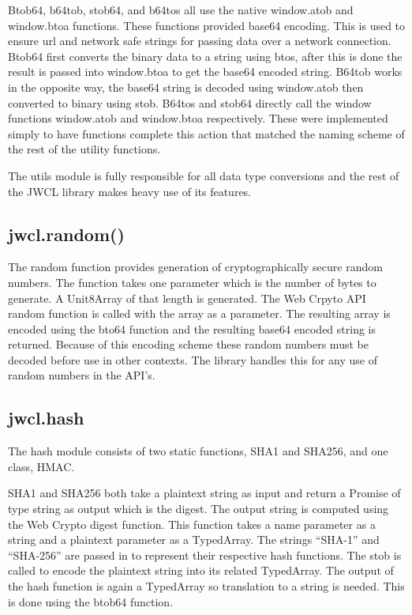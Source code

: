 Btob64, b64tob, stob64, and b64tos all use the native window.atob and window.btoa functions. \cite{mdn-base} These functions provided base64 encoding. This is used to ensure url and network safe strings for passing data over a network connection. Btob64 first converts the binary data to a string using btos, after this is done the result is passed into window.btoa to get the base64 encoded string. B64tob works in the opposite way, the base64 string is decoded using window.atob then converted to binary using stob. B64tos and stob64 directly call the window functions window.atob and window.btoa respectively. These were implemented simply to have functions complete this action that matched the naming scheme of the rest of the utility functions.


The utils module is fully responsible for all data type conversions and the rest of the JWCL library makes heavy use of its features.


\subsection{jwcl.random()}


The random function provides generation of cryptographically secure random numbers. The function takes one parameter which is the number of bytes to generate. A Unit8Array of that length is generated. The Web Crpyto API random function is called with the array as a parameter. The resulting array is encoded using the bto64 function and the resulting base64 encoded string is returned. Because of this encoding scheme these random numbers must be decoded before use in other contexts. The library handles this for any use of random numbers in the API’s.


\subsection{jwcl.hash}


The hash module consists of two static functions, SHA1 and SHA256, and one class, HMAC.


SHA1 and SHA256 both take a plaintext string as input and return a Promise of type string as output which is the digest. The output string is computed using the Web Crypto digest function. This function takes a name parameter as a string and a plaintext parameter as a TypedArray. The strings “SHA-1” and “SHA-256” are passed in to represent their respective hash functions. The stob is called to encode the plaintext string into its related TypedArray. The output of the hash function is again a TypedArray so translation to a string is needed. This is done using the btob64 function.


